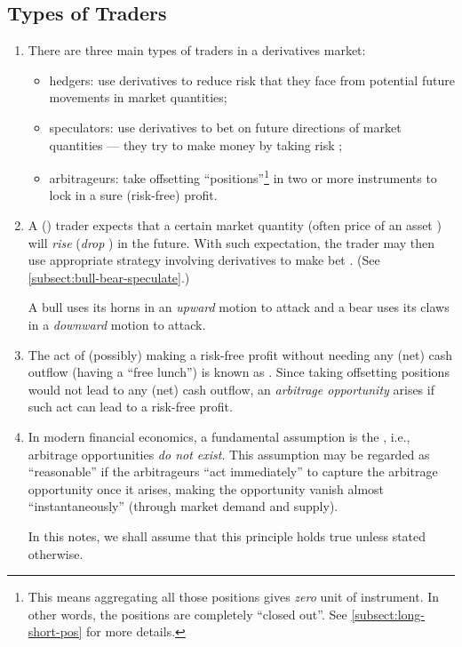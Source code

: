 \subsection{Types of Traders}
\begin{enumerate}
\item There are three main types of traders in a derivatives market:
\begin{itemize}
\item hedgers: use derivatives to reduce risk  that they face
from potential future movements  in market quantities;
\item speculators: use derivatives to bet  on future directions
of market quantities  --- they try to make money
 by taking risk ;
\item arbitrageurs: take offsetting ``positions''\footnote{This means
aggregating all those positions gives \emph{zero} unit of instrument. In other
words, the positions are completely ``closed out''. See
\cref{subsect:long-short-pos} for more details.} in two or more instruments to
lock in  a sure (risk-free) profit.
\end{itemize}

\item A  () trader expects that a certain market
quantity (often price of an asset ) will \emph{rise}
{\color{ForestGreen}} (\emph{drop}
{\color{red}}) in the future. With such expectation, the
trader may then use appropriate strategy involving derivatives to make bet
. (See \cref{subsect:bull-bear-speculate}.)

\begin{mnemonic}
A bull uses its horns in an \emph{upward}  motion to attack and a bear uses its
claws in a \emph{downward}  motion to attack.
\end{mnemonic}


\item The act of (possibly) making a risk-free profit without needing any (net) cash
outflow (having a ``free lunch'') is known as . Since taking
offsetting positions would not lead to any (net) cash outflow, an
\emph{arbitrage opportunity} arises if such act can lead to a risk-free profit.

\item \label{it:no-arbitrage-principle}
In modern financial economics, a fundamental assumption is the
, i.e., arbitrage opportunities \emph{do not
exist}. This assumption may be regarded as ``reasonable'' if the arbitrageurs
``act immediately'' to capture the arbitrage opportunity once it arises, making the
opportunity vanish almost ``instantaneously'' (through market demand and supply).

In this notes, we shall assume that this principle holds true unless stated
otherwise.
\end{enumerate}

